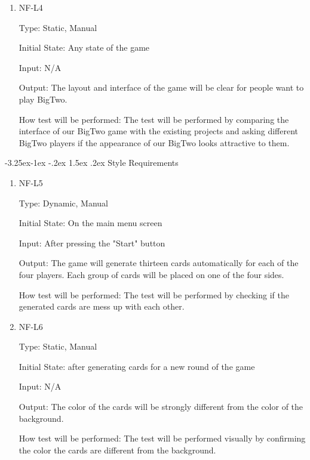 \documentclass[12pt, titlepage]{article}
\makeatletter
\renewcommand\paragraph{\@startsection{paragraph}{4}{\z@}%
                                     {-3.25ex\@plus -1ex \@minus -.2ex}%
                                     {1.5ex \@plus .2ex}%
                                     {\normalfont\normalsize\bfseries}}
\makeatother
\begin{document}
\begin{enumerate}
\item{NF-L4\\}

Type: Static, Manual
					
Initial State: Any state of the game
					
Input: N/A
					
Output: The layout and interface of the game will be clear for people want to play BigTwo.
					
How test will be performed: The test will be performed by comparing the interface of our BigTwo game with the existing projects and asking different BigTwo players if the appearance of our BigTwo looks attractive to them.
\end{enumerate}

\paragraph{Style Requirements}
\begin{enumerate}


\item{NF-L5\\}

Type: Dynamic, Manual
					
Initial State: On the main menu screen
					
Input: After pressing the "Start" button
					
Output: The game will generate thirteen cards automatically for each of the four players. Each group of cards will be placed on one of the four sides.
					
How test will be performed: The test will be performed by checking if the generated cards are mess up with each other. 

\item{NF-L6\\}

Type: Static, Manual
					
Initial State: after generating cards for a new round of the game
					
Input: N/A
					
Output: The color of the cards will be strongly different from the color of the background. 
					
How test will be performed: The test will be performed visually by confirming the color the cards are different from the background.

\end{enumerate}
\end{document}
